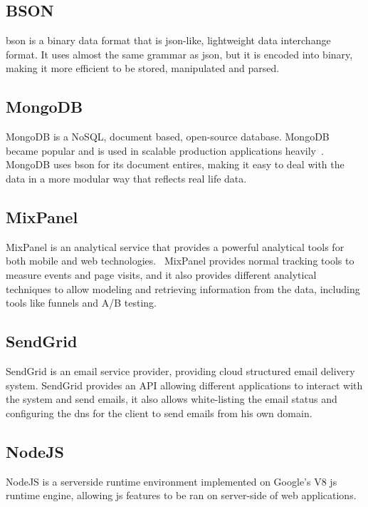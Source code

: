 \subsection{BSON}
\label{sub:bson}
\ac{bson} is a binary data format that is \ac{json}-like, lightweight data interchange format. It uses almost the same grammar as \ac{json}, but it
is encoded into binary, making it more efficient to be stored, manipulated and parsed.~\cite{bson}

\subsection{MongoDB\texttrademark{}}
\label{sub:mongodb}
MongoDB\texttrademark{} is a NoSQL, document based, open-source database. MongoDB\texttrademark{} became popular and is used in
scalable production applications heavily~\cite{dbs_rank}. MongoDB\texttrademark{} uses \ac{bson} for its document entires, making
it easy to deal with the data in a more modular way that reflects real life data.

\subsection{MixPanel\texttrademark{}}
\label{sub:mixpanel}
MixPanel\texttrademark{} is an analytical service that provides a powerful analytical tools for both mobile and web technologies.~\cite{mixpanel}
MixPanel\texttrademark{} provides normal tracking tools to measure events and page visits, and it also provides different analytical
techniques to allow modeling and retrieving information from the data, including tools like funnels and A/B testing.~\cite{mixpanel}

\subsection{SendGrid\texttrademark{}}
\label{sub:sendgrid}
SendGrid\texttrademark{} is an email service provider, providing cloud structured email delivery system. SendGrid\texttrademark{} provides
an API allowing different applications to interact with the system and send emails, it also allows white-listing the email status and configuring
the \ac{dns} for the client to send emails from his own domain.~\cite{sendgrid}

\subsection{NodeJS}
\label{sub:node}
NodeJS is a serverside runtime environment implemented on Google's V8 \ac{js} runtime engine, allowing \ac{js} features to be ran
on server-side of web applications.~\cite{nodejs}

